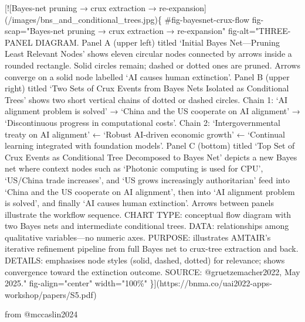 \documentclass[
  11pt,
  letterpaper,
]{book}
\newenvironment{Shaded}{\begin{snugshade}}{\end{snugshade}}
\newcommand{\CommentTok}[1]{\textcolor[rgb]{0.37,0.37,0.37}{#1}}
\newcommand{\NormalTok}[1]{\textcolor[rgb]{0.00,0.23,0.31}{#1}}
\newcommand{\OtherTok}[1]{\textcolor[rgb]{0.00,0.23,0.31}{#1}}
\begin{document}
\begin{Shaded}
\begin{Highlighting}[]
\CommentTok{[}\OtherTok{![Bayes{-}net pruning → crux extraction → re{-}expansion}\CommentTok{](/images/bns\_and\_conditional\_trees.jpg)}\NormalTok{\{}
\NormalTok{    \#fig{-}bayesnet{-}crux{-}flow}
\NormalTok{    fig{-}scap="Bayes{-}net pruning → crux extraction → re{-}expansion"}
\NormalTok{    fig{-}alt="THREE{-}PANEL DIAGRAM. Panel A (upper left) titled ‘Initial Bayes Net—Pruning Least Relevant Nodes’ shows eleven circular nodes connected by arrows inside a rounded rectangle. Solid circles remain; dashed or dotted ones are pruned. Arrows converge on a solid node labelled ‘AI causes human extinction’. Panel B (upper right) titled ‘Two Sets of Crux Events from Bayes Nets Isolated as Conditional Trees’ shows two short vertical chains of dotted or dashed circles. Chain 1: ‘AI alignment problem is solved’ → ‘China and the US cooperate on AI alignment’ → ‘Discontinuous progress in computational costs’. Chain 2: ‘Intergovernmental treaty on AI alignment’ ← ‘Robust AI{-}driven economic growth’ ← ‘Continual learning integrated with foundation models’. Panel C (bottom) titled ‘Top Set of Crux Events as Conditional Tree Decomposed to Bayes Net’ depicts a new Bayes net where context nodes such as ‘Photonic computing is used for CPU’, ‘US/China trade increases’, and ‘US grows increasingly authoritarian’ feed into ‘China and the US cooperate on AI alignment’, then into ‘AI alignment problem is solved’, and finally ‘AI causes human extinction’. Arrows between panels illustrate the workflow sequence. CHART TYPE: conceptual flow diagram with two Bayes nets and intermediate conditional trees. DATA: relationships among qualitative variables—no numeric axes. PURPOSE: illustrates AMTAIR’s iterative refinement pipeline from full Bayes net to crux{-}tree extraction and back. DETAILS: emphasises node styles (solid, dashed, dotted) for relevance; shows convergence toward the extinction outcome. SOURCE: @gruetzemacher2022, May 2025."}
\NormalTok{    fig{-}align="center"                        }
\NormalTok{    width="100\%"}
\NormalTok{\}](https://bnma.co/uai2022{-}apps{-}workshop/papers/S5.pdf)}







\NormalTok{from @mccaslin2024}


\end{Highlighting}
\end{Shaded}
\end{document}
